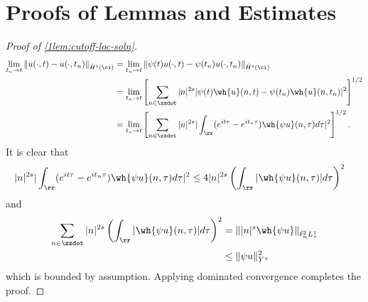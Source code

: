 \section{Proofs of Lemmas and Estimates}
\begin{proof}[Proof of \cref{1lem:cutoff-loc-soln}]
%
%
\begin{equation*}
	\begin{split}
		\lim_{t_{n} \to t} \|u(\cdot, t) - u(\cdot, t_{n})\|_{\dot{H}^s(\ci)} 
		& = \lim_{t_{n} \to t} \|\psi(t) u(\cdot, t) - \psi(t_n) u(\cdot,
		t_{n})\|_{\dot{H}^s(\ci)} 
		\\
		& = \lim_{t_n \to t} \left[ \sum_{n \in \zzdot}| n |
		^{2s} | \psi(t)  \wh{u}(n, t) - \psi(t_n) \wh{ u}(n, t_n) |^2 \right]^{1/2}
		\\
		& = \lim_{t_n \to t} \left[ \sum_{n \in \zzdot} | n |^{2s} | \int_{\rr} (e^{it \tau} - e^{it_{n} \tau}) \wh{\psi u}(n,
		\tau) d \tau |^2 \right]^{1/2}.
	\end{split}
\end{equation*}
		It is clear that
		\begin{equation*}
			\begin{split}
				| n |
				^{2s} | \int_{\rr} (e^{it \tau} - e^{it_{n}\tau}) \wh{\psi u}(n, \tau) d \tau |^2 
		& \le 4  | n |^{2s} \left ( \int_{\rr} |\wh{\psi u}(n, \tau)| d \tau
		\right )^2 
	\end{split}
\end{equation*}
and 
%
%
\begin{equation*}
	\begin{split}
 \sum_{n \in \zzdot} | n |^{2s} \left ( \int_{\rr} |\wh{\psi u}(n, \tau)| d \tau
		\right ) ^2 
		& = \| |n |^s \wh{\psi u}\|_{\dot{\ell}_n^2 L_\tau^1}
		\\
		& \le \|\psi u \|_{Y^s}^2 
	\end{split}
\end{equation*}
which is bounded by assumption.
Applying dominated convergence completes the proof. 
\end{proof}
%
%
